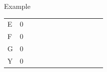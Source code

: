 \documentclass{bredelebeamer}
\begin{document}
\begin{frame}{Example}
\begin{table}[]
\begin{tabular}{*{13}{p{0.4cm}}}
\multicolumn{1}{l|}{E}  & \multicolumn{1}{l|}{0} & \multicolumn{1}{l|}{}  & \multicolumn{1}{l|}{}  & \multicolumn{1}{l|}{}  & \multicolumn{1}{l|}{}  & \multicolumn{1}{l|}{}  & \multicolumn{1}{l|}{}  & \multicolumn{1}{l|}{}  &    \multicolumn{1}{l|}{}  & \multicolumn{1}{l|}{}  & \multicolumn{1}{l|}{}  & \multicolumn{1}{l|}{}  \\ \cline{2-13}  %
\multicolumn{1}{l|}{F}  & \multicolumn{1}{l|}{0} & \multicolumn{1}{l|}{}  & \multicolumn{1}{l|}{}  & \multicolumn{1}{l|}{}  & \multicolumn{1}{l|}{}  & \multicolumn{1}{l|}{}  & \multicolumn{1}{l|}{}  & \multicolumn{1}{l|}{}  & \multicolumn{1}{l|}{}  & \multicolumn{1}{l|}{}  & \multicolumn{1}{l|}{}  & \multicolumn{1}{l|}{}  \\ \cline{2-13} 
\multicolumn{1}{l|}{G}  & \multicolumn{1}{l|}{0} & \multicolumn{1}{l|}{}  & \multicolumn{1}{l|}{}  & \multicolumn{1}{l|}{}  & \multicolumn{1}{l|}{}  & \multicolumn{1}{l|}{}  & \multicolumn{1}{l|}{}  & \multicolumn{1}{l|}{}  & \multicolumn{1}{l|}{}  & \multicolumn{1}{l|}{}  & \multicolumn{1}{l|}{}  & \multicolumn{1}{l|}{}  \\ \cline{2-13} 
\multicolumn{1}{l|}{Y}  & \multicolumn{1}{l|}{0} & \multicolumn{1}{l|}{}  & \multicolumn{1}{l|}{}  & \multicolumn{1}{l|}{}  & \multicolumn{1}{l|}{}  & \multicolumn{1}{l|}{}  & \multicolumn{1}{l|}{}  & \multicolumn{1}{l|}{}  & \multicolumn{1}{l|}{}  & \multicolumn{1}{l|}{}  & \multicolumn{1}{l|}{}  & \multicolumn{1}{l|}{}  \\ \cline{2-13} 
\end{tabular}
\end{table}
     
 \end{frame}
 
\end{document}
